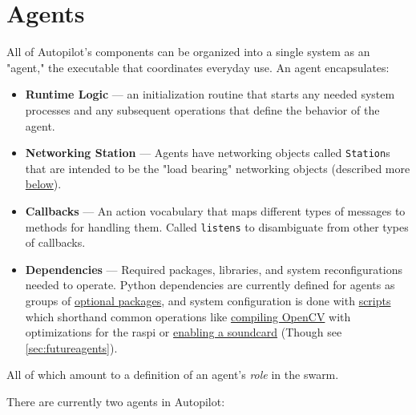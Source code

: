 \section{Agents}
\label{sec:agents}

All of Autopilot's components can be organized into a single system as an "agent," the executable that coordinates everyday use. An agent encapsulates:

\begin{itemize}
\item \textbf{Runtime Logic} --- an initialization routine that starts any needed system processes and any subsequent operations that define the behavior of the agent.
\item \textbf{Networking Station} --- Agents have networking objects called \texttt{Station}s that are intended to be the "load bearing" networking objects (described more \hyperref[sec:networking]{below}).
\item \textbf{Callbacks} --- An action vocabulary that maps different types of messages to methods for handling them. Called \texttt{listens} to disambiguate from other types of callbacks.
\item \textbf{Dependencies} --- Required packages, libraries, and system reconfigurations needed to operate. Python dependencies are currently defined for agents as groups of \href{https://peps.python.org/pep-0621/\#dependencies-optional-dependencies}{optional packages}, and system configuration is done with \href{https://docs.auto-pi-lot.com/en/latest/setup/scripts.html}{scripts} which shorthand common operations like \href{https://github.com/wehr-lab/autopilot/blob/90956187d4222f16f67ab8b39b8359da954d5dcc/autopilot/setup/scripts.py\#L140-L183}{compiling OpenCV} with optimizations for the raspi or \href{https://github.com/wehr-lab/autopilot/blob/90956187d4222f16f67ab8b39b8359da954d5dcc/autopilot/setup/scripts.py\#L92-L100}{enabling a soundcard} (Though see \ref{sec:futureagents}).
\end{itemize}

All of which amount to a definition of an agent's \textit{role} in the swarm.

\clearpage

There are currently two agents in Autopilot: 

